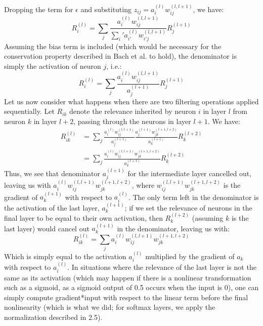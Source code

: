 \documentclass{article}
\begin{document}
Dropping the term for $\epsilon$ and substituting $z_{ij} = a_i^{(l)} w_{ij}^{(l,l+1)}$, we have:
\begin{equation}
R_i^(l) = \sum_j \frac{a_i^{(l)} w_{ij}^{(l,l+1)}}{\sum_i' a_{i'}^{(l)} w_{i'j}^{(l,l+1)}} R_j^{(l+1)}
\end{equation}
Assuming the bias term is included (which would be necessary for the conservation property described in Bach et al. to hold), the denominator is simply the activation of neuron $j$, i.e.:
\begin{equation}
R_i^(l) = \sum_j \frac{a_i^{(l)} w_{ij}^{(l,l+1)}}{a_j^{(l+1)}} R_j^{(l+1)}
\end{equation}
Let us now consider what happens when there are two filtering operations applied sequentially. Let $R_{ik}$ denote the relevance inherited by neuron $i$ in layer $l$ from neuron $k$ in layer $l+2$, passing through the neurons in layer $l+1$. We have:
\begin{equation}
\begin{aligned}
R_{ik}^{(l)} &= \sum_j \frac{a_i^{(l)} w_{ij}^{(l,l+1)}}{a_j^{(l+1)}} \frac{a_j^{(l+1)} w_{jk}^{(l+1,l+2)}}{a_k^{(l+1)}} R_{k}^{(l+2)}\\
              &= \sum_j  \frac{a_i^{(l)} w_{ij}^{(l,l+1)} w_{jk}^{(l+1,l+2)}}{a_k^{(l+1)}} R_{k}^{(l+2)}
\end{aligned}
\end{equation}
Thus, we see that denominator $a_j^{(l+1)}$ for the intermediate layer cancelled out, leaving us with $a_i^{(l)} w_{ij}^{(l,l+1)}w_{jk}^{(l+1,l+2)}$, where $w_{ij}^{(l,l+1)} w_{jk}^{(l+1,l+2)}$ is the gradient of $a_k^{(l+1)}$ with respect to $a_i^{(l)}$. The only term left in the denominator is the activation of the last layer, $a_k^{(l+1)}$; if we set the relevance of neurons in the final layer to be equal to their own activation, then $R_{k}^{(l+2)}$ (assuming $k$ is the last layer) would cancel out $a_k^{(l+1)}$ in the denominator, leaving us with:
\begin{equation}
R_{ik}^{(l)} =  \sum_j  a_i^{(l)} w_{ij}^{(l,l+1)}w_{jk}^{(l+1,l+2)}
\end{equation}
Which is simply equal to the activation $a_i^{(l)}$ multiplied by the gradient of $a_k$ with respect to $a_i^{(l)}$. In situations where the relevance of the last layer is not the same as its activation (which may happen if there is a nonlinear transformation such as a sigmoid, as a sigmoid output of 0.5 occurs when the input is 0), one can simply compute gradient*input with respect to the linear term before the final nonlinearity (which is what we did; for softmax layers, we apply the normalization described in 2.5).
\end{document}
